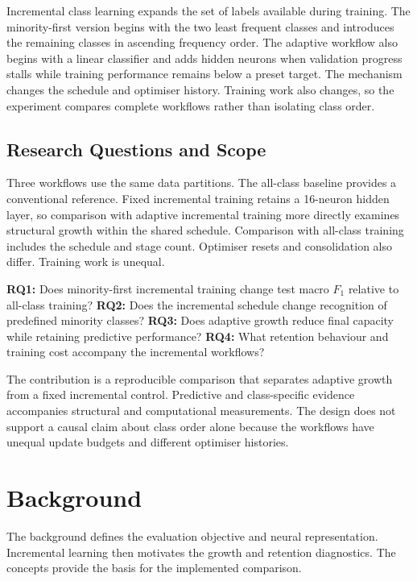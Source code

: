 \documentclass[conference,10pt]{IEEEtran}
\begin{document}
Incremental class learning expands the set of labels available during training. The minority-first version begins with the two least frequent classes and introduces the remaining classes in ascending frequency order. The adaptive workflow also begins with a linear classifier and adds hidden neurons when validation progress stalls while training performance remains below a preset target. The mechanism changes the schedule and optimiser history. Training work also changes, so the experiment compares complete workflows rather than isolating class order.

\subsection{Research Questions and Scope}

Three workflows use the same data partitions. The all-class baseline provides a conventional reference. Fixed incremental training retains a 16-neuron hidden layer, so comparison with adaptive incremental training more directly examines structural growth within the shared schedule. Comparison with all-class training includes the schedule and stage count. Optimiser resets and consolidation also differ. Training work is unequal.

\noindent\textbf{RQ1:} Does minority-first incremental training change test macro $F_1$ relative to all-class training? \textbf{RQ2:} Does the incremental schedule change recognition of predefined minority classes? \textbf{RQ3:} Does adaptive growth reduce final capacity while retaining predictive performance? \textbf{RQ4:} What retention behaviour and training cost accompany the incremental workflows?

The contribution is a reproducible comparison that separates adaptive growth from a fixed incremental control. Predictive and class-specific evidence accompanies structural and computational measurements. The design does not support a causal claim about class order alone because the workflows have unequal update budgets and different optimiser histories.

\section{Background}

The background defines the evaluation objective and neural representation. Incremental learning then motivates the growth and retention diagnostics. The concepts provide the basis for the implemented comparison.
\end{document}
